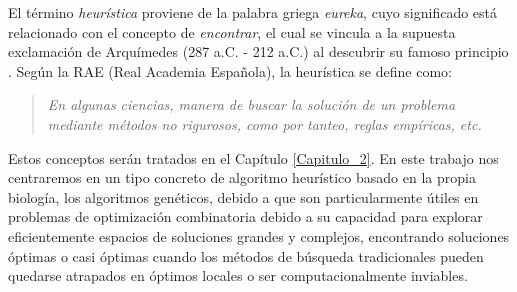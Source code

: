 \documentclass[12pt,a4paper]{book}
\begin{document}
El término \textsl{heurística} proviene de la palabra griega \textsl{eureka}, cuyo significado está relacionado con el concepto de \textsl{encontrar}, el cual se vincula a la supuesta exclamación de Arquímedes (287 a.C. - 212 a.C.) al descubrir su famoso principio \cite{e_besada_optimizacion_nodate}. Según la RAE (Real Academia Española), la heurística se define como: 
\begin{quote}
\textsl{En algunas ciencias, manera de buscar la solución de un problema mediante métodos no rigurosos, como por tanteo, reglas empíricas, etc.}
\end{quote}
Estos conceptos serán tratados en el Capítulo \ref{Capitulo_2}. En este trabajo nos centraremos en un tipo concreto de algoritmo heurístico basado en la propia biología, los algoritmos genéticos, debido a que son particularmente útiles en problemas de optimización combinatoria debido a su capacidad para explorar eficientemente espacios de soluciones grandes y complejos, encontrando soluciones óptimas o casi óptimas cuando los métodos de búsqueda tradicionales pueden quedarse atrapados en óptimos locales o ser computacionalmente inviables.


	
\end{document}

